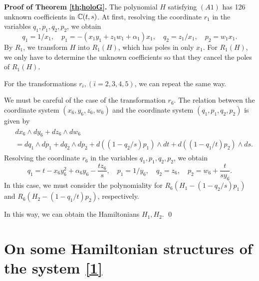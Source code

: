 {\bf Proof of Theorem \ref{th;holoG}.}
The polynomial $H$ satisfying $(A1)$ has 126 unknown coefficients in ${\Bbb C}(t,s)$.
At first, resolving the coordinate $r_1$ in the variables $q_1,p_1,q_2,p_2$, we obtain
\begin{equation}\tag*{($R_1$)}
q_1=1/x_1, \quad p_1=-(x_1y_1+z_1w_1+\alpha_1)x_1, \quad q_2=z_1/x_1, \quad p_2=w_1x_1.
\end{equation}
 By $R_1$, we transform $H$ into $R_1(H)$, which has poles in only $x_1$. For $R_1(H)$, we only have to determine the unknown coefficients so that they cancel the poles of $R_1(H)$.

For the transformations $r_i, (i=2,3,4,5)$, we can repeat the same way.

We must be careful of the case of the transformation $r_6$. The relation between the coordinate system $(x_6,y_6,z_6,w_6)$ and the coordinate system $(q_1,p_1,q_2,p_2)$ is given by
\begin{align}
\begin{split}
&dx_6 \wedge dy_6 +dz_6 \wedge dw_6\\
&=dq_1 \wedge dp_1 +dq_2 \wedge dp_2+d((1-q_2/s)p_1) \wedge dt+d((1-q_1/t)p_2) \wedge ds.
\end{split}
\end{align}
Resolving the coordinate $r_6$ in the variables $q_1,p_1,q_2,p_2$, we obtain
\begin{equation}\tag*{($R_6$)}
q_1=t-x_6y_6^2+\alpha_6 y_6-\frac{t z_6}{s}, \quad p_1=1/y_6, \quad q_2=z_6, \quad p_2=w_6+\frac{t}{sy_6}.
\end{equation}
In this case, we must consider the polynomiality for $R_6(H_1-(1-q_2/s)p_1)$ and $R_6(H_2-(1-q_1/t)p_2)$, respectively.

In this way, we can obtain the Hamiltonians $H_1,H_2$. \qed






\section{On some Hamiltonian structures of the system \eqref{1}}

